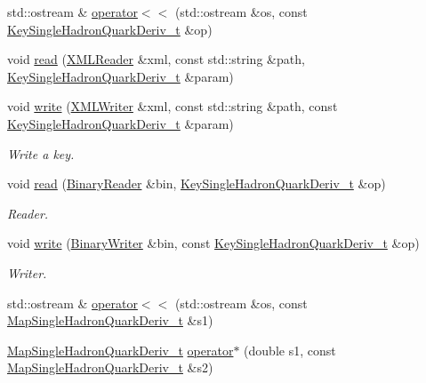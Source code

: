 \begin{DoxyCompactItemize}
std\+::ostream \& \mbox{\hyperlink{namespaceHadron_a4875d0c001c7eed8b1cb2f65a5e9fb6f}{operator$<$$<$}} (std\+::ostream \&os, const \mbox{\hyperlink{structHadron_1_1KeySingleHadronQuarkDeriv__t}{Key\+Single\+Hadron\+Quark\+Deriv\+\_\+t}} \&op)
\item 
void \mbox{\hyperlink{namespaceHadron_a41f47831ad3fb4b08af916cdee176a33}{read}} (\mbox{\hyperlink{classADATXML_1_1XMLReader}{X\+M\+L\+Reader}} \&xml, const std\+::string \&path, \mbox{\hyperlink{structHadron_1_1KeySingleHadronQuarkDeriv__t}{Key\+Single\+Hadron\+Quark\+Deriv\+\_\+t}} \&param)
\item 
void \mbox{\hyperlink{namespaceHadron_ad598d89ca80f65de661af491b2ee51e2}{write}} (\mbox{\hyperlink{classADATXML_1_1XMLWriter}{X\+M\+L\+Writer}} \&xml, const std\+::string \&path, const \mbox{\hyperlink{structHadron_1_1KeySingleHadronQuarkDeriv__t}{Key\+Single\+Hadron\+Quark\+Deriv\+\_\+t}} \&param)
\begin{DoxyCompactList}\small\item\em Write a key. \end{DoxyCompactList}\item 
void \mbox{\hyperlink{namespaceHadron_a14726c9fa76350682d7ef85457af512b}{read}} (\mbox{\hyperlink{classADATIO_1_1BinaryReader}{Binary\+Reader}} \&bin, \mbox{\hyperlink{structHadron_1_1KeySingleHadronQuarkDeriv__t}{Key\+Single\+Hadron\+Quark\+Deriv\+\_\+t}} \&op)
\begin{DoxyCompactList}\small\item\em Reader. \end{DoxyCompactList}\item 
void \mbox{\hyperlink{namespaceHadron_a3d7c7b8fcc5310fee44294d5900816fb}{write}} (\mbox{\hyperlink{classADATIO_1_1BinaryWriter}{Binary\+Writer}} \&bin, const \mbox{\hyperlink{structHadron_1_1KeySingleHadronQuarkDeriv__t}{Key\+Single\+Hadron\+Quark\+Deriv\+\_\+t}} \&op)
\begin{DoxyCompactList}\small\item\em Writer. \end{DoxyCompactList}\item 
std\+::ostream \& \mbox{\hyperlink{namespaceHadron_a800dbac093bd07f370068965de5868b3}{operator$<$$<$}} (std\+::ostream \&os, const \mbox{\hyperlink{namespaceHadron_aa588220689caea8a6aad4d0296526e6b}{Map\+Single\+Hadron\+Quark\+Deriv\+\_\+t}} \&s1)
\item 
\mbox{\hyperlink{namespaceHadron_aa588220689caea8a6aad4d0296526e6b}{Map\+Single\+Hadron\+Quark\+Deriv\+\_\+t}} \mbox{\hyperlink{namespaceHadron_a559c56047e1679b244bd6770b9f3c3b8}{operator$\ast$}} (double s1, const \mbox{\hyperlink{namespaceHadron_aa588220689caea8a6aad4d0296526e6b}{Map\+Single\+Hadron\+Quark\+Deriv\+\_\+t}} \&s2)

\end{DoxyCompactItemize}
